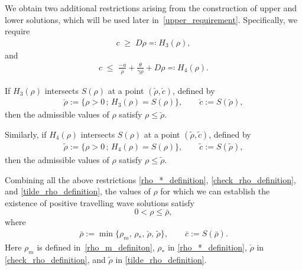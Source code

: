 \documentclass[11pt]{article}
\theoremstyle{definition}
\begin{document}
We obtain two additional restrictions arising from the construction of upper
and lower solutions, which will be used later in~\eqref{upper_requirement}.
Specifically, we require
\begin{align}\label{H3_condition}
    c \;\ge\; D\rho \eqqcolon H_{3}(\rho),
\end{align}
and
\begin{align}\label{H4_condition}
    c \;\le\; \frac{-a}{\rho} + \frac{\theta}{\gamma\rho} + D\rho
    \eqqcolon H_{4}(\rho).
\end{align}

If $H_{3}(\rho)$ intersects $S(\rho)$ at a point $(\check{\rho},\check{c})$,
defined by
\begin{align}\label{check_rho_definition}
    \check{\rho} := \{\rho>0 \,;\, H_{3}(\rho)=S(\rho)\},
    \qquad
    \check{c} := S(\check{\rho}),
\end{align}
then the admissible values of $\rho$ satisfy $\rho \le \check{\rho}$.

Similarly, if $H_{4}(\rho)$ intersects $S(\rho)$ at a point
$(\tilde{\rho},\tilde{c})$, defined by
\begin{align}\label{tilde_rho_definition}
    \tilde{\rho} := \{\rho>0 \,;\, H_{4}(\rho)=S(\rho)\},
    \qquad
    \tilde{c} := S(\tilde{\rho}),
\end{align}
then the admissible values of $\rho$ satisfy $\rho \le \tilde{\rho}$.



Combining all the above restrictions
\eqref{rho_*_definition}, \eqref{check_rho_definition}, and
\eqref{tilde_rho_definition}, the values of $\rho$ for which we can establish
the existence of positive travelling wave solutions satisfy
\[
0 < \rho \le \bar{\rho},
\]
where
\begin{align}\label{bold_rho}
    \bar{\rho}
    := \min\{\rho_m,\, \rho_{*},\, \check{\rho},\, \tilde{\rho}\},
    \qquad
    \bar{c} := S(\bar{\rho}).
\end{align}
Here $\rho_m$ is defined in~\eqref{rho_m_definiton}, $\rho_*$ in \eqref{rho_*_definition}, $\check \rho$ in \eqref{check_rho_definition}, and $\tilde \rho$ in \eqref{tilde_rho_definition}.

\medskip
\end{document}
